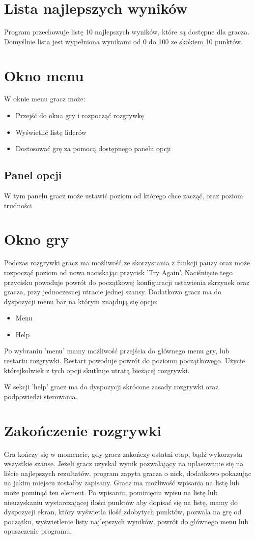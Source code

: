 \documentclass[a4paper]{article}
\begin{document}
\section{Lista najlepszych wyników}
Program przechowuje listę 10 najlepszych wyników, które są dostępne dla gracza. Domyślnie lista jest wypełniona wynikami od 0 do 100 ze skokiem 10 punktów.
\section{Okno menu}
W oknie menu gracz może:
\begin{itemize}
\item Przejść do okna gry i rozpocząć rozgrywkę
\item Wyświetlić listę liderów
\item Dostosować grę za pomocą dostępnego panelu opcji
\end{itemize}
\subsection{Panel opcji}
W tym panelu gracz może ustawić poziom od którego chce zacząć, oraz poziom trudności
\section{Okno gry}
Podczas rozgrywki gracz ma możliwość ze skorzystania z funkcji pauzy oraz może rozpocząć poziom od nowa naciskając przycisk 'Try Again'. Naciśnięcie tego przycisku powoduje powrót do początkowej konfiguracji ustawienia skrzynek oraz gracza, przy jednoczesnej utracie jednej szansy. Dodatkowo gracz ma do dyspozycji menu bar na którym znajdują się opcje:
\begin{itemize}
\item Menu
\item Help
\end{itemize}
Po wybraniu 'menu' mamy możliwość przejścia do głównego menu gry, lub restartu rozgrywki. Restart powoduje powrót do poziomu początkowego. Użycie którejkolwiek z tych opcji skutkuje utratą bieżącej rozgrywki.

W sekcji 'help' gracz ma do dyspozycji skrócone zasady rozgrywki oraz podpowiedzi sterowania.

\section{Zakończenie rozgrywki}
Gra kończy się w momencie, gdy gracz zakończy ostatni etap, bądź wykorzysta wszystkie szanse. Jeżeli gracz uzyskał wynik pozwalający na uplasowanie się na liście najlepszych rezultatów, program zapyta gracza o nick, dodatkowo pokazując na jakim miejscu zostałby zapisany. Gracz ma możliwość wpisania na listę lub może pominąć ten element. Po wpisaniu, pominięciu wpisu na listę lub nieuzyskaniu wystarczającej ilości punktów aby dopisać się na listę, mamy do dyspozycji ekran, który wyświetla ilość zdobytych punktów, pozwala na grę od początku, wyświetlenie listy najlepszych wyników, powrót do głównego menu lub opuszczenie programu.
\end{document}
